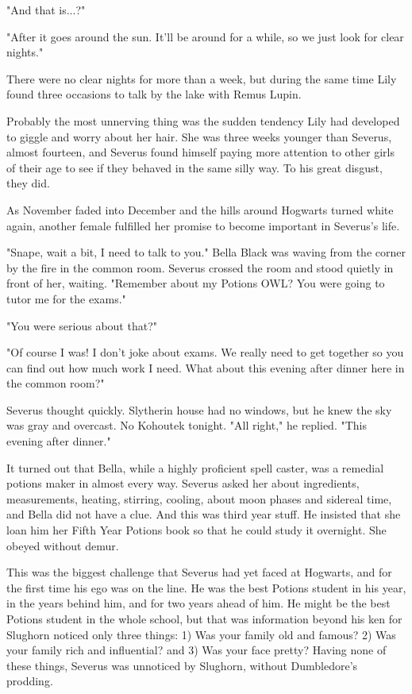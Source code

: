 "And that is...?"

"After it goes around the sun. It'll be around for a while, so we just look for clear nights."

There were no clear nights for more than a week, but during the same time Lily found three occasions to talk by the lake with Remus Lupin.

Probably the most unnerving thing was the sudden tendency Lily had developed to giggle and worry about her hair. She was three weeks younger than Severus, almost fourteen, and Severus found himself paying more attention to other girls of their age to see if they behaved in the same silly way. To his great disgust, they did.

As November faded into December and the hills around Hogwarts turned white again, another female fulfilled her promise to become important in Severus's life.

"Snape, wait a bit, I need to talk to you." Bella Black was waving from the corner by the fire in the common room. Severus crossed the room and stood quietly in front of her, waiting. "Remember about my Potions OWL? You were going to tutor me for the exams."

"You were serious about that?"

"Of course I was! I don't joke about exams. We really need to get together so you can find out how much work I need. What about this evening after dinner here in the common room?"

Severus thought quickly. Slytherin house had no windows, but he knew the sky was gray and overcast. No Kohoutek tonight. "All right," he replied. "This evening after dinner."

It turned out that Bella, while a highly proficient spell caster, was a remedial potions maker in almost every way. Severus asked her about ingredients, measurements, heating, stirring, cooling, about moon phases and sidereal time, and Bella did not have a clue. And this was third year stuff. He insisted that she loan him her Fifth Year Potions book so that he could study it overnight. She obeyed without demur.

This was the biggest challenge that Severus had yet faced at Hogwarts, and for the first time his ego was on the line. He was the best Potions student in his year, in the years behind him, and for two years ahead of him. He might be the best Potions student in the whole school, but that was information beyond his ken for Slughorn noticed only three things: 1) Was your family old and famous? 2) Was your family rich and influential? and 3) Was your face pretty? Having none of these things, Severus was unnoticed by Slughorn, without Dumbledore's prodding.

